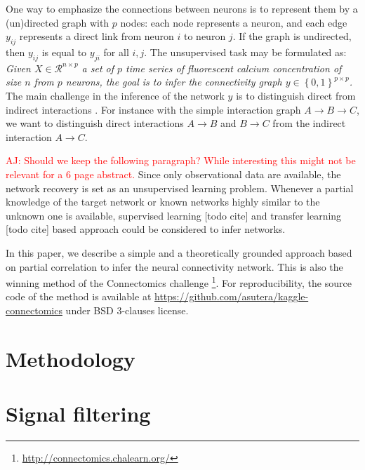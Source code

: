 \documentclass[wcp]{jmlr}
\begin{document}
One way to emphasize the connections between neurons is to represent them by a
(un)directed graph with $p$ nodes: each node represents a neuron, and each
edge $y_{ij}$ represents a direct link from neuron  $i$ to neuron $j$. If the
graph is undirected, then $y_{ij}$ is equal to $y_{ji}$  for all $i,j$.
The unsupervised task may be formulated as:
\textit{Given $X \in \mathcal{R}^{n \times p}$  a set of $p$ time series of
fluorescent calcium concentration of size $n$ from $p$ neurons, the goal is to
infer the connectivity graph $y \in \left\{0, 1\right\}^{p \times p}$.}
The main challenge in the inference of the network $y$
is to distinguish direct from indirect interactions \cite{de2004discovery}.
For instance with the simple interaction graph $A \rightarrow B \rightarrow C$,
we want to distinguish direct interactions $A \rightarrow B$ and $B \rightarrow C$
from the indirect interaction $A \rightarrow C$.

\textcolor{red}{AJ: Should we keep the following paragraph? While interesting
                this might not be relevant for a 6 page abstract.}
Since only observational data are available, the network recovery is set as an
unsupervised learning problem. Whenever a partial knowledge of the target
network or known networks highly similar to the unknown one is available,
supervised learning [todo cite] and transfer learning  [todo cite] based
approach could be considered to infer networks.

In this paper, we describe a simple and a theoretically grounded approach
based on partial correlation to infer the neural connectivity network.
This is also the winning method of the Connectomics challenge
\footnote{\url{http://connectomics.chalearn.org/}}. For reproducibility, the
source code of the method is available at
\url{https://github.com/asutera/kaggle-connectomics} under BSD 3-clauses
license.



\section{Methodology}
\section{Signal filtering} \label{sec:filter}
\end{document}
